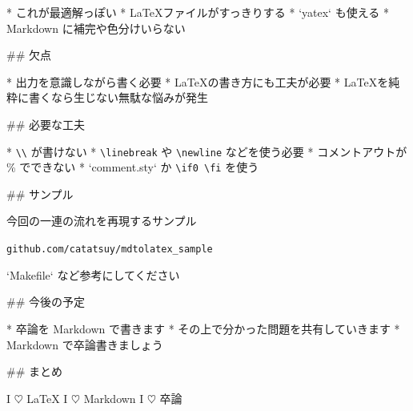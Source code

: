 * これが最適解っぽい
* \LaTeX ファイルがすっきりする
* `yatex` も使える
* Markdown に補完や色分けいらない

## 欠点

* 出力を意識しながら書く必要
* \LaTeX の書き方にも工夫が必要
* \LaTeX を純粋に書くなら生じない無駄な悩みが発生

## 必要な工夫

* \verb+\\+ が書けない
    * \verb+\linebreak+ や \verb+\newline+ などを使う必要
* コメントアウトが \% でできない
    * `comment.sty` か \verb/\if0 \fi/ を使う


## サンプル

今回の一連の流れを再現するサンプル

\begin{center}
\verb+github.com/catatsuy/mdtolatex_sample+
\end{center}

`Makefile` など参考にしてください


## 今後の予定

* 卒論を Markdown で書きます
* その上で分かった問題を共有していきます
* Markdown で卒論書きましょう


## まとめ

\vspace{-25pt}
\begin{center}
 \Huge
 I $\heartsuit$ \LaTeX \linebreak
 I $\heartsuit$ Markdown \linebreak
 I $\heartsuit$ 卒論
\end{center}
